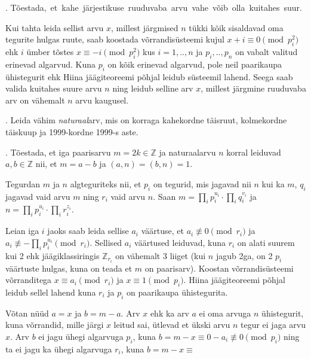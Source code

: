 \documentclass[a4paper, 10pt]{article}
\newcommand{\Z}{\mathbb{Z}}
\begin{document}
. \mbox{Tõestada, et kahe järjestikuse ruuduvaba arvu vahe võib olla kuitahes suur.}

\bigskip
Kui tahta leida sellist arvu $x$, millest järgmised $n$ tükki kõik sisaldavad oma tegurite hulgas ruute, saab koostada võrrandisüsteemi kujul $x+i\equiv 0\pmod {p_i^2}$ ehk $i$ ümber tõstes $x\equiv -i\pmod {p_i^2}$ kus $i=1,..,n$ ja $p_i,..,p_n$ on vabalt valitud erinevad algarvud. Kuna $p_i$ on kõik erinevad algarvud, pole neil paarikaupa ühistegurit ehk Hiina jäägiteoreemi põhjal leidub süsteemil lahend. Seega saab valida kuitahes suure arvu $n$ ning leidub selline arv $x$, millest järgmine ruuduvaba arv on vähemalt $n$ arvu kaugusel.
\bigskip

. Leida vähim \emph{naturaal}arv, mis on korraga kahekordne täisruut, kolmekordne täiskuup ja 1999-kordne 1999-s aste. 

\bigskip

. Tõestada, et iga paarisarvu $m=2k\in\Z$ ja naturaalarvu $n$ korral leiduvad $a,b\in\Z$ nii, et $m=a-b$ ja $(a,n) = (b,n) = 1$. 

\bigskip
Tegurdan $m$ ja $n$ algteguriteks nii, et $p_i$ on tegurid, mis jagavad nii $n$ kui ka $m$, $q_i$ jagavad vaid arvu $m$ ning $r_i$ vaid arvu $n$. Saan $m=\prod_ip_i^{u_i}\cdot\prod_iq_i^{v_i}$ ja $n=\prod_ip_i^{u_i}\cdot\prod_ir_i^{z_i}$. 

Leian iga $i$ jaoks saab leida sellise $a_i$ väärtuse, et $a_i\not\equiv0\pmod{r_i}$ ja $a_i\not\equiv-\prod_ip_i^{u_i}\pmod{r_i}$. Sellised $a_i$ väärtused leiduvad, kuna $r_i$ on alati suurem kui 2 ehk jäägiklassiringis $\Z_{r_i}$ on vähemalt 3 liiget (kui $n$ jagub 2ga, on 2 $p_i$ väärtuste hulgas, kuna on teada et $m$ on paarisarv). Koostan võrrandisüsteemi võrranditega $x\equiv a_i\pmod{r_i}$ ja $x\equiv1\pmod{p_i}$. Hiina jäägiteoreemi põhjal leidub sellel lahend kuna $r_i$ ja $p_i$ on paarikaupa ühistegurita.

Võtan nüüd $a=x$ ja $b=m-a$. Arv $x$ ehk ka arv $a$ ei oma arvuga $n$ ühistegurit, kuna võrrandid, mille järgi $x$ leitud sai, ütlevad et ükski arvu $n$ tegur ei jaga arvu $x$. Arv $b$ ei jagu ühegi algarvuga $p_i$, kuna $b= m-x\equiv 0-a_i\not\equiv0\pmod{p_i}$ ning ta ei jagu ka ühegi algarvuga $r_i$, kuna $b=m-x\equiv$
\end{document}
